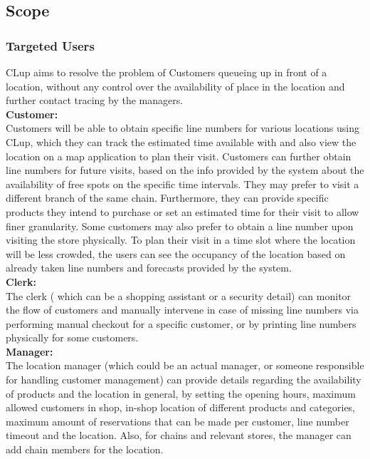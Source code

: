 
\subsection{Scope}

\subsubsection{Targeted Users}

CLup aims to resolve the problem of Customers queueing up in front of a location, without any control over the availability of place in the location and further contact tracing by the managers.
\\[0.5cm]
\textbf{Customer:} \\

Customers will be able to obtain specific line numbers for various locations using CLup, which they can track the estimated time available with and also view the location on a map application to plan their visit.
Customers can further obtain line numbers for future visits, based on the info provided by the system about the availability of free spots on the specific time intervals.
They may prefer to visit a different branch of the same chain.
Furthermore, they can provide specific products they intend to purchase or set an estimated time for their visit to allow finer granularity.
Some customers may also prefer to obtain a line number upon visiting the store physically.
To plan their visit in a time slot where the location will be less crowded, the users can see the occupancy of the location based on already taken line numbers and forecasts provided by the system.
\\[0.5cm]
\textbf{Clerk:} \\
The clerk ( which can be a shopping assistant or a security detail) can monitor the flow of customers and manually intervene in case of missing line numbers via performing manual checkout for a specific customer, or by printing line numbers physically for some customers.
\\[0.5cm]
\textbf{Manager:} \\

The location manager (which could be an actual manager, or someone responsible for handling customer management) can provide details regarding the availability of products and the location in general, by setting the opening hours, maximum allowed customers in shop, in-shop location of different products and categories, maximum amount of reservations that can be made per customer, line number timeout and the location.
Also, for chains and relevant stores, the manager can add chain members for the location.

